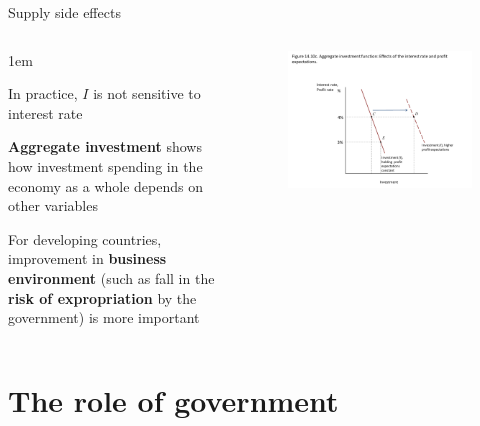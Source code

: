 \documentclass[11pt,aspectratio=43,usenames,dvipsnames]{beamer}
\let\olditemize=\itemize
\let\endolditemize=\enditemize
\renewenvironment{itemize}{\olditemize \itemsep1em}{\endolditemize}
\theoremstyle{definition}
\begin{document}
\begin{frame}{Supply side effects}
\label{slide:Supply_side_effects}
    \begin{columns}
        \begin{column}{0.3\textwidth}
            \begin{itemize}
                \item<only@1> \alert{In practice}, $ I $ is not sensitive to interest rate
                \item<only@1> \textbf{Aggregate investment} shows how investment spending in the economy as a whole depends on other variables
                \item<only@2> For developing countries, improvement in \textbf{business environment} (such as fall in the \textbf{risk of expropriation} by the government) is more important
            \end{itemize}

        \end{column}
        \begin{column}{0.7\textwidth}
            \begin{figure}
                \centering
                \includegraphics[width=\textwidth]{./figures/13.pdf}
                \caption{}
            \end{figure}

        \end{column}
    \end{columns}

\end{frame}

\section[\faBuildingO]{The role of government}
\label{sec:The_role_of_government}
\end{document}
